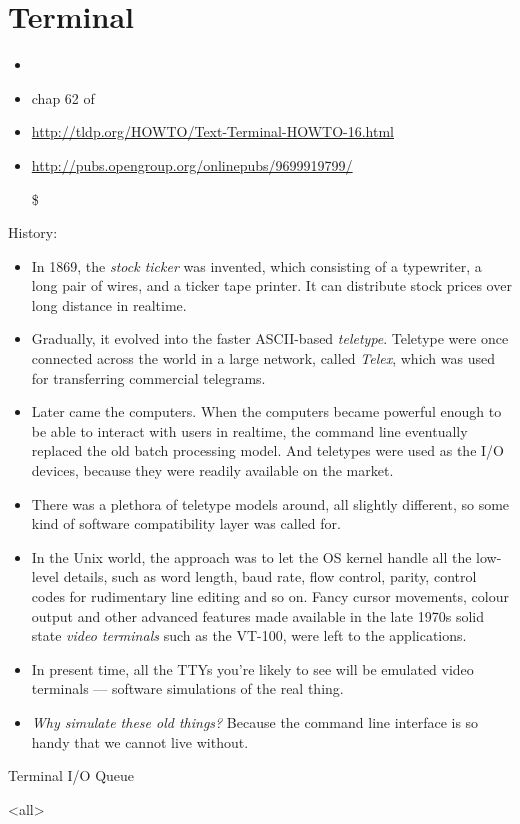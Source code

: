 \mode*
\part{Terminal}

\begin{itemize}
\item {}
\item chap 62 of 
\item \url{http://tldp.org/HOWTO/Text-Terminal-HOWTO-16.html}
\item \url{http://pubs.opengroup.org/onlinepubs/9699919799/}
\item[\$] 
\end{itemize}

History:
\begin{itemize}
\item In 1869, the \emph{stock ticker} was invented, which consisting of a typewriter, a
  long pair of wires, and a ticker tape printer. It can distribute stock prices over long
  distance in realtime.
\item Gradually, it evolved into the faster ASCII-based \emph{teletype}. Teletype were
  once connected across the world in a large network, called \emph{Telex}, which was used
  for transferring commercial telegrams.
\item Later came the computers. When the computers became powerful enough to be able to
  interact with users in realtime, the command line eventually replaced the old batch
  processing model. And teletypes were used as the I/O devices, because they were readily
  available on the market.
\item There was a plethora of teletype models around, all slightly different, so some kind
  of software compatibility layer was called for. 
\item In the Unix world, the approach was to let the OS kernel handle all the low-level
  details, such as word length, baud rate, flow control, parity, control codes for
  rudimentary line editing and so on. Fancy cursor movements, colour output and other
  advanced features made available in the late 1970s solid state \emph{video terminals}
  such as the VT-100, were left to the applications.
\item In present time, all the TTYs you're likely to see will be emulated video terminals
  --- software simulations of the real thing.
\item \emph{Why simulate these old things?} Because the command line interface is so handy
  that we cannot live without.
\end{itemize}

\begin{frame}{Terminal I/O Queue}
\begin{center}
\end{center}
\end{frame}


\mode<all>
